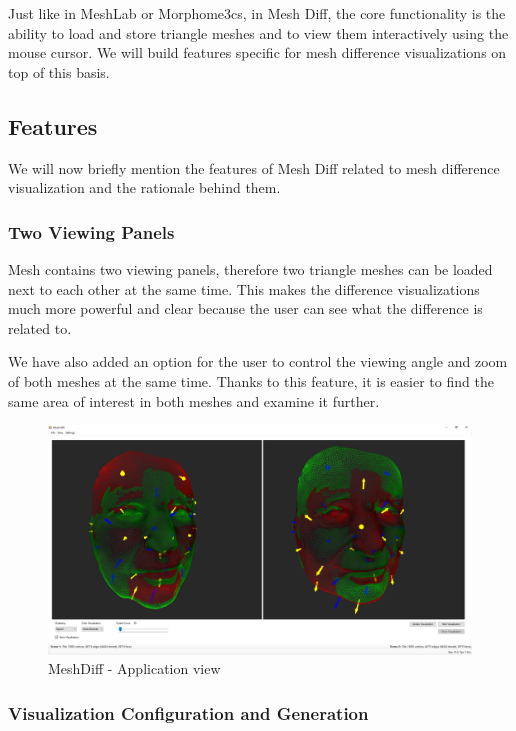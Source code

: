 Just like in MeshLab or Morphome3cs, in Mesh Diff, the core functionality is the ability to load and store triangle meshes and to view them interactively using the mouse cursor. We will build features specific for mesh difference visualizations on top of this basis.

\subsection{Features}
\label{sec:meshdiff_features}

We will now briefly mention the features of Mesh Diff related to mesh difference visualization and the rationale behind them.

\subsubsection{Two Viewing Panels}

Mesh contains two viewing panels, therefore two triangle meshes can be loaded next to each other at the same time. This makes the difference visualizations much more powerful and clear because the user can see what the difference is related to.

We have also added an option for the user to control the viewing angle and zoom of both meshes at the same time. Thanks to this feature, it is easier to find the same area of interest in both meshes and examine it further.

\begin{figure}[h]
\centering
\includegraphics[width=\textwidth]{./img/meshdiff.PNG}
\caption{MeshDiff - Application view}
\label{fig:meshdiff}
\end{figure}

\subsubsection{Visualization Configuration and Generation}

